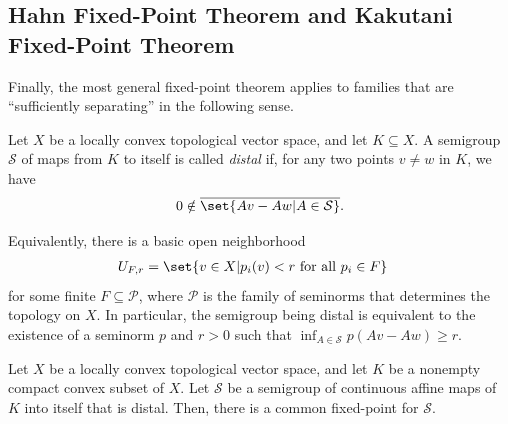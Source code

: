 \documentclass[10pt]{mypackage}
\begin{document}
\subsection{Hahn Fixed-Point Theorem and Kakutani Fixed-Point Theorem}%
Finally, the most general fixed-point theorem applies to families that are ``sufficiently separating'' in the following sense. 
\begin{definition}
  Let $X$ be a locally convex topological vector space, and let $K\subseteq X$. A semigroup $\mathcal{S}$ of maps from $K$ to itself is called \textit{distal} if, for any two points $v\neq w $ in $ K$, we have
  \begin{align*}
    0\notin \overline{\set{Av - Aw | A\in \mathcal{S}}}.
  \end{align*}
\end{definition}
Equivalently, there is a basic open neighborhood
\begin{align*}
  U_{F,r} &= \set{v\in X | p_i(v)< r\text{ for all }p_i\in F}
\end{align*}
for some finite $F\subseteq \mathcal{P}$, where $ \mathcal{P} $ is the family of seminorms that determines the topology on $X$. In particular, the semigroup being distal is equivalent to the existence of a seminorm $p$ and $r > 0$ such that $\inf_{A\in \mathcal{S}}p\left( Av - Aw \right) \geq r$.
\begin{theorem}
  Let $X$ be a locally convex topological vector space, and let $K$ be a nonempty compact convex subset of $X$. Let $\mathcal{S}$ be a semigroup of continuous affine maps of $K$ into itself that is distal. Then, there is a common fixed-point for $\mathcal{S}$.
\end{theorem}
\end{document}
